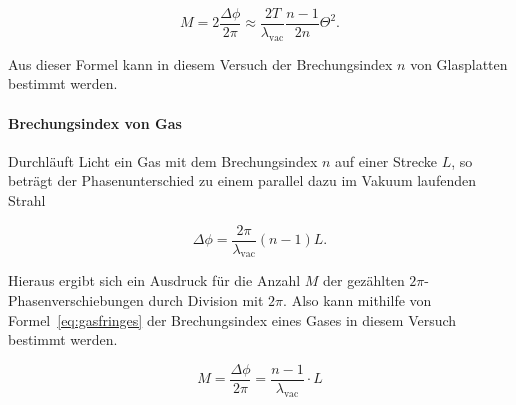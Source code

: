 \begin{equation}
M = 2\frac{\Delta\phi}{2\pi} \approx \frac{2T}{\lambda_\text{vac}}
\frac{n-1}{2n}\Theta^2.
\label{eq:glasfringes}
\end{equation}

Aus dieser Formel kann in diesem Versuch der Brechungsindex $n$ von Glasplatten bestimmt werden.

\paragraph{Brechungsindex von Gas}
Durchläuft Licht ein Gas mit dem Brechungsindex $n$ auf einer Strecke $L$, so beträgt der Phasenunterschied zu einem parallel dazu im Vakuum laufenden Strahl

\begin{equation}
\Delta\phi = \frac{2\pi}{\lambda_\text{vac}}(n-1)L.
\end{equation}

Hieraus ergibt sich ein Ausdruck für die Anzahl $M$ der gezählten $2\pi$-Phasen\-ver\-schie\-bung\-en durch Division mit $2\pi$. Also kann mithilfe von Formel~\eqref{eq:gasfringes} der Brechungsindex eines Gases in diesem Versuch bestimmt werden. 

\begin{equation}
M = \frac{\Delta\phi}{2\pi} = \frac{n-1}{\lambda_\text{vac}}\cdot L
\label{eq:gasfringes}
\end{equation}
